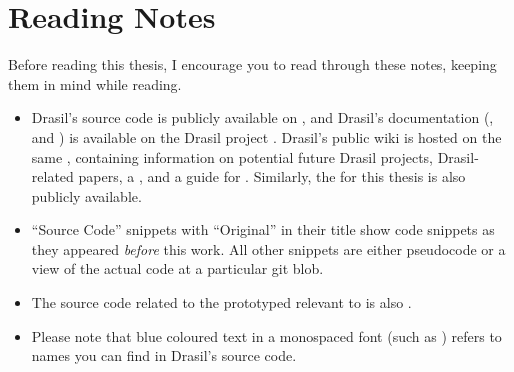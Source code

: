 \chapter{Reading Notes}
\label{chap:reading_notes}

Before reading this thesis, I encourage you to read through these notes, keeping
them in mind while reading.

\begin{itemize}

      \item Drasil's source code is publicly available on
            , and
            Drasil's documentation
            (,
            and
            )
            is available on the Drasil project
            .
            Drasil's public wiki is hosted on the same ,
            containing information on potential future Drasil projects,
            Drasil-related papers, a ,
            and a guide for .
            Similarly, the 
            for this thesis is also publicly available.

      \item ``Source Code'' snippets with ``Original'' in their title show code
            snippets as they appeared \textit{before} this work. All other
            snippets are either pseudocode or a view of the actual code at a
            particular git blob.

      \item The source code related to the prototyped \ChunkDB{} relevant to
             is also .

      \item Please note that blue coloured text in a monospaced font (such as
            \ExampleText{}) refers to names you can find in Drasil's source
            code.


\end{itemize}
